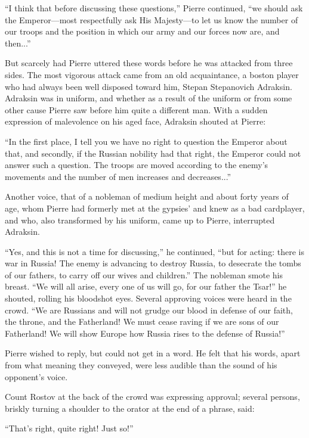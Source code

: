 ``I think that before discussing these questions,'' Pierre
continued, ``we should ask the Emperor---most respectfully ask
His Majesty---to let us know the number of our troops and the
position in which our army and our forces now are, and then...''

But scarcely had Pierre uttered these words before he was
attacked from three sides. The most vigorous attack came from an
old acquaintance, a boston player who had always been well
disposed toward him, Stepan Stepanovich Adraksin. Adraksin was in
uniform, and whether as a result of the uniform or from some
other cause Pierre saw before him quite a different man. With a
sudden expression of malevolence on his aged face, Adraksin
shouted at Pierre:

``In the first place, I tell you we have no right to question the
Emperor about that, and secondly, if the Russian nobility had
that right, the Emperor could not answer such a question. The
troops are moved according to the enemy's movements and the
number of men increases and decreases...''

Another voice, that of a nobleman of medium height and about
forty years of age, whom Pierre had formerly met at the gypsies'
and knew as a bad cardplayer, and who, also transformed by his
uniform, came up to Pierre, interrupted Adraksin.

``Yes, and this is not a time for discussing,'' he continued,
``but for acting: there is war in Russia! The enemy is advancing
to destroy Russia, to desecrate the tombs of our fathers, to
carry off our wives and children.'' The nobleman smote his
breast. ``We will all arise, every one of us will go, for our
father the Tsar!'' he shouted, rolling his bloodshot
eyes. Several approving voices were heard in the crowd. ``We are
Russians and will not grudge our blood in defense of our faith,
the throne, and the Fatherland! We must cease raving if we are
sons of our Fatherland! We will show Europe how Russia rises to
the defense of Russia!''

Pierre wished to reply, but could not get in a word. He felt that
his words, apart from what meaning they conveyed, were less
audible than the sound of his opponent's voice.

Count Rostov at the back of the crowd was expressing approval;
several persons, briskly turning a shoulder to the orator at the
end of a phrase, said:

``That's right, quite right! Just so!''

